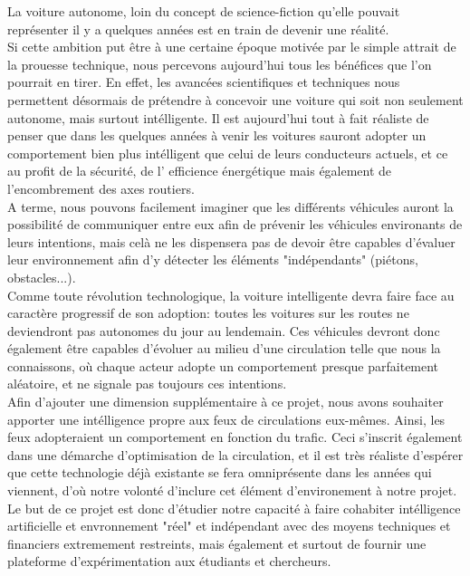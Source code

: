 La voiture autonome, loin du concept de science-fiction qu'elle pouvait représenter il y a quelques années est en train de devenir une réalité.\\

Si cette ambition put être à une certaine époque motivée par le simple attrait de la prouesse technique, nous percevons aujourd'hui tous les bénéfices que l'on pourrait en tirer.
En effet, les avancées scientifiques et techniques nous permettent désormais de prétendre à concevoir une voiture qui soit non seulement autonome, mais surtout intélligente. Il est aujourd'hui tout à fait réaliste de penser que dans les quelques années à venir les voitures sauront adopter un comportement bien plus intélligent que celui de leurs conducteurs actuels, et ce au profit de la sécurité, de l' efficience énergétique mais également de l'encombrement des axes routiers.\\

A terme, nous pouvons facilement imaginer que les différents véhicules auront la possibilité de communiquer entre eux afin de prévenir les véhicules environants de leurs intentions, mais celà ne les dispensera pas de devoir être capables d'évaluer leur environnement afin d'y détecter les éléments "indépendants" (piétons, obstacles...). \\

Comme toute révolution technologique, la voiture intelligente devra faire face au caractère progressif de son adoption: toutes les voitures sur les routes ne deviendront pas autonomes du jour au lendemain. Ces véhicules devront donc également être capables d'évoluer au milieu d'une circulation telle que nous la connaissons, où chaque acteur adopte un comportement presque parfaitement aléatoire, et ne signale pas toujours ces intentions.\\

Afin d'ajouter une dimension supplémentaire à ce projet, nous avons souhaiter apporter une intélligence propre aux feux de circulations eux-mêmes. Ainsi, les feux adopteraient un comportement en fonction du trafic. Ceci s'inscrit également dans une démarche d'optimisation de la circulation, et il est très réaliste d'espérer que cette technologie déjà existante se fera omniprésente dans les années qui viennent, d'où notre volonté d'inclure cet élément d'environement à notre projet.\\

Le but de ce projet est donc d'étudier notre capacité à faire cohabiter intélligence artificielle et envronnement "réel" et indépendant avec des moyens techniques et financiers extremement restreints, mais également et surtout de fournir une plateforme d'expérimentation aux étudiants et chercheurs.